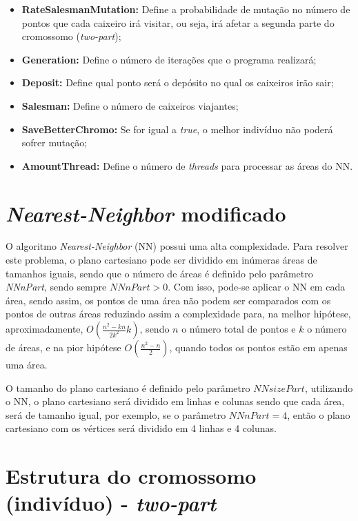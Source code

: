 \documentclass[12pt,openright,a4paper,oneside]{tcc}
\begin{document}
\begin{itemize}
                \item \textbf{RateSalesmanMutation:} Define a probabilidade de mutação no número de pontos que cada caixeiro irá visitar, ou seja, irá afetar a segunda parte do cromossomo (\textit{two-part});
                \item \textbf{Generation:} Define o número de iterações que o programa realizará;
                \item \textbf{Deposit:} Define qual ponto será o depósito no qual os caixeiros irão sair;
                \item \textbf{Salesman:} Define o número de caixeiros viajantes;
                \item \textbf{SaveBetterChromo:} Se for igual a \textit{true}, o melhor indivíduo não poderá sofrer mutação;
                \item \textbf{AmountThread:} Define o número de \textit{threads} para processar as áreas do NN.
            \end{itemize}   

		\section {\textit{Nearest-Neighbor} modificado}
            \label{NNMod}
		O algoritmo \textit{Nearest-Neighbor} (NN) possui uma alta complexidade. Para resolver este problema, o plano cartesiano pode ser dividido em inúmeras áreas de tamanhos iguais, sendo que o número de áreas é definido pelo parâmetro \textit{NNnPart}, sendo sempre $NNnPart > 0$. 
		Com isso, pode-se aplicar o NN em cada área, sendo assim, os pontos de uma área não podem ser comparados com os pontos de outras áreas reduzindo assim a complexidade para, na melhor hipótese, aproximadamente, $O(\frac{n^2-kn}{2k^2}k)$, sendo $n$ o número total de pontos e $k$ o número de áreas, e na pior hipótese $O(\frac{n^2-n}{2})$, quando todos os pontos estão em apenas uma área. 
		
		O tamanho do plano cartesiano é definido pelo parâmetro $NNsizePart$, utilizando o NN, o plano cartesiano será dividido em linhas e colunas sendo que cada área, será de tamanho igual, por exemplo, se o parâmetro $NNnPart = 4$, então o plano cartesiano com os vértices será dividido em 4 linhas e 4 colunas.  
		
		
		\section{Estrutura do cromossomo (indivíduo) - \textit{two-part}}
		
\end{document}
